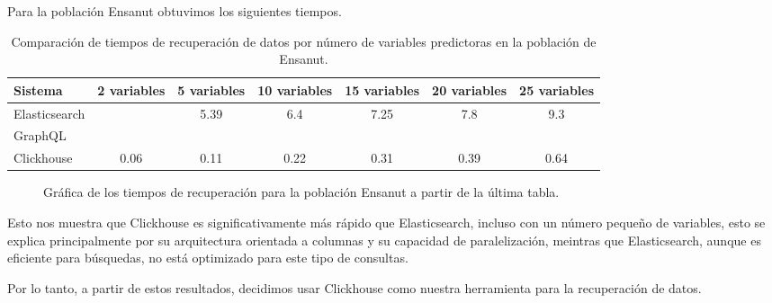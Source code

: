 \documentclass[
 12pt,
 letterpaper,
]{article}
\theoremstyle{teoremaBreak}
\theoremstyle{plain}
\theoremstyle{definition}
\begin{document}
Para la población Ensanut obtuvimos los siguientes tiempos.
\begin{table}[htbp]
\centering
\caption{Comparación de tiempos de recuperación de datos por número de variables predictoras en la población 
de Ensanut.}
\label{tab:comparacion-recuperacion-datos-ensanut}
\begin{tabular}{|l|c|c|c|c|c|c|}
\hline
Sistema & 2 variables & 5 variables & 10 variables & 15 variables & 20 variables & 25 variables  \\
\hline
Elasticsearch &  &5.39  &6.4  &7.25  &7.8  &9.3  \\
\hline
GraphQL &  &  &  &  &  &  \\
\hline
Clickhouse & 0.06  &0.11  &0.22  &0.31  &0.39  &0.64 \\
\hline
\end{tabular}
\end{table}

\begin{figure}[htbp]
\centering
{}
\caption{Gráfica de los tiempos de recuperación para la población Ensanut a partir de la última tabla.}
\label{fig:tiempos-ensanut}
\end{figure}

Esto nos muestra que Clickhouse es significativamente más rápido que Elasticsearch, incluso con un número pequeño de variables, 
esto se explica principalmente por su arquitectura orientada a columnas y su capacidad de paralelización, meintras que 
Elasticsearch, aunque es eficiente para búsquedas, no está optimizado para este tipo de consultas.

Por lo tanto, a partir de estos resultados, decidimos usar Clickhouse como nuestra herramienta para la recuperación de datos.
\end{document}
